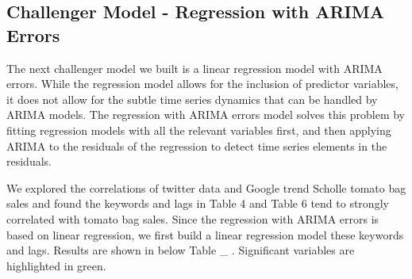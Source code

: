 \documentclass[12pt,oneside]{chicagocapstone}
\begin{document}
\subsection*{Challenger Model - Regression with ARIMA
Errors}\label{findings-Regression}

The next challenger model we built is a linear regression model with
ARIMA errors. While the regression model allows for the inclusion of
predictor variables, it does not allow for the subtle time series
dynamics that can be handled by ARIMA models. The regression with ARIMA
errors model solves this problem by fitting regression models with all
the relevant variables first, and then applying ARIMA to the residuals
of the regression to detect time series elements in the residuals.

We explored the correlations of twitter data and Google trend Scholle
tomato bag sales and found the keywords and lags in Table 4 and Table 6
tend to strongly correlated with tomato bag sales. Since the regression
with ARIMA errors is based on linear regression, we first build a linear
regression model these keywords and lags. Results are shown in below
Table \_ . Significant variables are highlighted in green.
\end{document}
